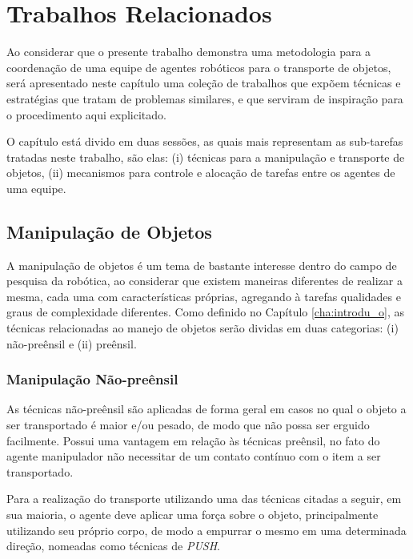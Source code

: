 \chapter{Trabalhos Relacionados} %
\label{cha:trabalhos_relacionados}

Ao considerar que o presente trabalho demonstra uma metodologia para a coordenação de uma equipe de agentes robóticos para o transporte de objetos, será apresentado neste capítulo uma coleção de trabalhos que expõem técnicas e estratégias que tratam de problemas similares, e que serviram de inspiração para o procedimento aqui explicitado.

O capítulo está divido em duas sessões, as quais mais representam as sub-tarefas tratadas neste trabalho, são elas: (i) técnicas para a manipulação e transporte de objetos, (ii) mecanismos para controle e alocação de tarefas entre os agentes de uma equipe.


\section{Manipulação de Objetos} %
\label{sec:t_cnicas_de_manipula_o_de_objetos}

A manipulação de objetos é um tema de bastante interesse dentro do campo de pesquisa da robótica, ao considerar que existem maneiras diferentes de realizar a mesma, cada uma com características próprias, agregando à tarefas qualidades e graus de complexidade diferentes.
Como definido no Capítulo \ref{cha:introdu_o}, as técnicas relacionadas ao manejo de objetos serão dividas em duas categorias: (i) não-preênsil e (ii) preênsil.

\subsection{Manipulação Não-preênsil} %
\label{sub:manipula_o_n_o_pre_nsil}

As técnicas não-preênsil são aplicadas de forma geral em casos no qual o objeto a ser transportado é maior e/ou pesado, de modo que não possa ser erguido facilmente.
Possui uma vantagem em relação às técnicas preênsil, no fato do agente manipulador não necessitar de um contato contínuo com o item a ser transportado.

Para a realização do transporte utilizando uma das técnicas citadas a seguir, em sua maioria, o agente deve aplicar uma força sobre o objeto, principalmente utilizando seu próprio corpo, de modo a empurrar o mesmo em uma determinada direção, nomeadas como técnicas de \emph{PUSH}.

